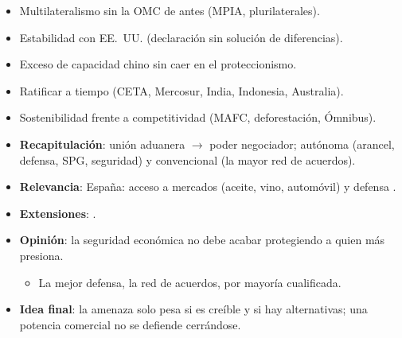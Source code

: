 \documentclass{article}
\begin{document}
\begin{columnas}
\begin{itemize}
\item Multilateralismo sin la OMC de antes (MPIA, plurilaterales).
\item Estabilidad con EE.~UU. (declaración sin solución de diferencias).
\item Exceso de capacidad chino sin caer en el proteccionismo.
\item Ratificar a tiempo (CETA, Mercosur, India, Indonesia, Australia).
\item Sostenibilidad frente a competitividad (MAFC, deforestación, Ómnibus).
\end{itemize}

\begin{itemize}
\item \textbf{Recapitulación}: unión aduanera $\to$ poder negociador; autónoma (arancel, defensa, SPG, seguridad) y convencional (la mayor red de acuerdos).
\item \textbf{Relevancia}: España: acceso a mercados (aceite, vino, automóvil) y defensa .
\item \textbf{Extensiones}:     .
\item \textbf{Opinión}: la seguridad económica no debe acabar protegiendo a quien más presiona.
  \begin{itemize}
  \item La mejor defensa, la red de acuerdos, por mayoría cualificada.
  \end{itemize}
\item \textbf{Idea final}: la amenaza solo pesa si es creíble y si hay alternativas; una potencia comercial no se defiende cerrándose.
\end{itemize}


\end{columnas}
\end{document}
